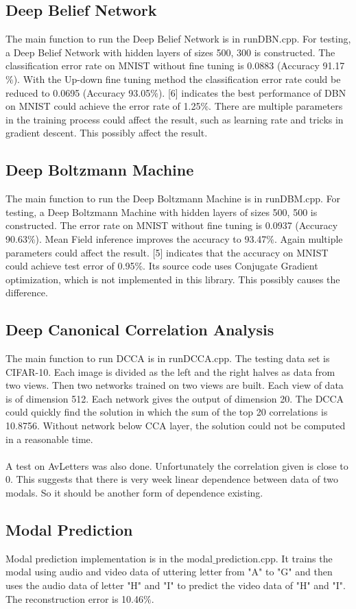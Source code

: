 \documentclass[12pt]{article}
\begin{document}
\subsection{Deep Belief Network}
The main function to run the Deep Belief Network is in runDBN.cpp. For testing, a Deep Belief Network with hidden layers of sizes 500, 300 is constructed. The classification error rate on MNIST without fine tuning is 0.0883 (Accuracy 91.17$\%$). With the Up-down fine tuning method the classification error rate could be reduced to 0.0695 (Accuracy 93.05$\%$). [6] indicates the best performance of DBN on MNIST could achieve the error rate of 1.25$\%$. There are multiple parameters in the training process could affect the result, such as learning rate and tricks in gradient descent. This possibly affect the result.
\subsection{Deep Boltzmann Machine}
The main function to run the Deep Boltzmann Machine is in runDBM.cpp. For testing, a Deep Boltzmann Machine with hidden layers of sizes 500, 500 is constructed. The error rate on MNIST without fine tuning is 0.0937 (Accuracy 90.63$\%$). Mean Field inference improves the accuracy to 93.47$\%$. Again multiple parameters could affect the result. [5] indicates that the accuracy on MNIST could achieve test error of 0.95$\%$. Its source code uses Conjugate Gradient optimization, which is not implemented in this library. This possibly causes the difference.
\subsection{Deep Canonical Correlation Analysis}
The main function to run DCCA is in runDCCA.cpp. The testing data set is CIFAR-10. Each image is divided as the left and the right halves as data from two views. Then two networks trained on two views are built. Each view of data is of dimension 512. Each network gives the output of dimension 20. The DCCA could quickly find the solution in which the sum of the top 20 correlations is 10.8756. Without network below CCA layer, the solution could not be computed in a reasonable time.\\
\\
A test on AvLetters was also done. Unfortunately the correlation given is close to 0. This suggests that there is very week linear dependence between data of two modals. So it should be another form of dependence existing.
\subsection{Modal Prediction}
Modal prediction implementation is in the modal$\_$prediction.cpp. It trains the modal using audio and video data of uttering letter from "A" to "G" and then uses the audio data of letter "H" and "I" to predict the video data of "H" and "I". The reconstruction error is 10.46$\%$.
\clearpage
\nocite{*}


\end{document}
